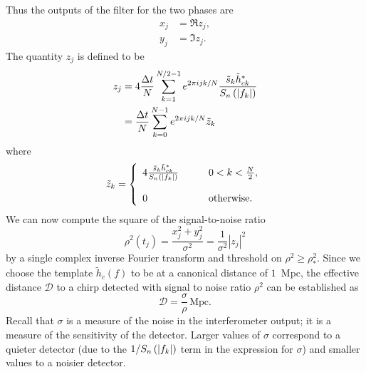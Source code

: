 Thus the outputs of the filter for the two phases are
\begin{align}
x_j &= \Re z_j, \\
y_j &= \Im z_j.
\end{align}
The quantity $z_j$ is defined to be
\begin{equation}
\begin{split}
\label{eq:zdef}
z_j &= 4 \frac{\Delta t}{N}\sum_{k=1}^{N/2-1} e^{2\pi ijk/N} 
\frac{\tilde{s}_k \tilde{h}_{ck}^\ast}{S_n\left(\left|f_{k}\right|\right)}  \\
&= \frac{\Delta t}{N}\sum_{k=0}^{N-1} e^{2\pi ijk/N} \tilde{z}_k
\end{split}
\end{equation}
where
\begin{equation}
\label{eq:ztildedef}
\tilde{z}_k = \left\{
\begin{array}{ll}
4 \frac{\tilde{s}_k \tilde{h}_{ck}^\ast}{S_n\left(\left|f_{k}\right|\right)} 
  \quad\quad & 0 < k < \frac{N}{2},\\
\\
0 & \mathrm{otherwise}.
\end{array}
\right.
\end{equation}
We can now compute the square of the signal-to-noise ratio
\begin{equation}
\rho^2(t_j) = \frac{x_j^2 + y_j^2}{\sigma^2} = \frac{1}{\sigma^2}|z_j|^2
\end{equation}
by a single complex inverse Fourier transform and threshold on $\rho^2 \ge
\rho^2_\ast$.  Since we choose the template $\tilde{h}_c(f)$ to be at a
canonical distance of $1$~Mpc, the effective distance $\mathcal{D}$ to a chirp
detected with signal to noise ratio $\rho^2$ can be established as
\begin{equation}
\mathcal{D} = \frac{\sigma}{\rho} \,\mathrm{Mpc}.
\label{eq:effdistdef}
\end{equation}
Recall that $\sigma$ is a measure of the noise in the interferometer output;
it is a measure of the sensitivity of the detector.  Larger values of $\sigma$
correspond to a quieter detector (due to the $1/S_n\left(\left|f_{k}\right|\right)$ term in the expression
for $\sigma$) and smaller values to a noisier detector. 


